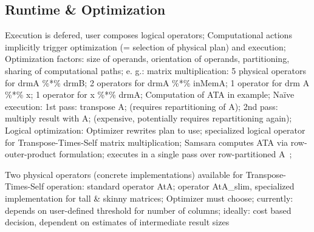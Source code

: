 \documentclass{article}
\begin{document}
\subsection{Runtime \& Optimization}

Execution is defered, user composes logical operators; Computational actions implicitly trigger optimization (= selection of physical plan) and execution; Optimization factors:  size of operands, orientation of operands, partitioning, sharing of computational paths; e. g.: matrix multiplication: 5 physical operators for drmA \%*\% drmB; 2 operators for drmA \%*\% inMemA; 1 operator for drm A \%*\% x; 1 operator for x \%*\% drmA; Computation of ATA in example; Naïve execution: 1st  pass: transpose A; (requires repartitioning of A); 2nd pass: multiply result with A; (expensive, potentially requires repartitioning again); Logical optimization: Optimizer rewrites plan to use; specialized logical operator for Transpose-Times-Self matrix multiplication; Samsara computes ATA via row-outer-product formulation; executes in a single pass over row-partitioned A~\cite{Schelter2012}; 



Two physical operators (concrete implementations) available for Transpose-Times-Self operation: standard operator AtA; operator AtA\_slim, specialized implementation for tall \& skinny matrices; Optimizer must choose; currently: depends on user-defined threshold for number of columns; ideally: cost based decision, dependent on estimates of intermediate result sizes
\end{document}
